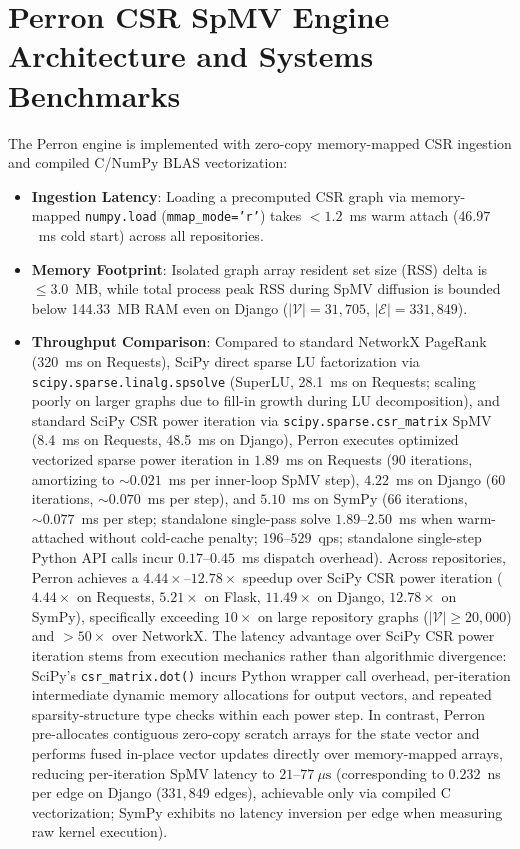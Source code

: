 \documentclass[10pt]{article}
\begin{document}
\section{Perron CSR SpMV Engine Architecture and Systems Benchmarks}
\label{app:csr_benchmarks}

The Perron engine is implemented with zero-copy memory-mapped CSR ingestion and compiled C/NumPy BLAS vectorization:
\begin{itemize}[noitemsep,topsep=2pt,parsep=0pt,partopsep=0pt]
    \item \textbf{Ingestion Latency}: Loading a precomputed CSR graph via memory-mapped \texttt{numpy.load} (\texttt{mmap\_mode='r'}) takes $<1.2$~ms warm attach ($46.97$~ms cold start) across all repositories.
    \item \textbf{Memory Footprint}: Isolated graph array resident set size (RSS) delta is $\le 3.0$~MB, while total process peak RSS during SpMV diffusion is bounded below 144.33~MB RAM even on Django ($|\mathcal{V}|=31{,}705$, $|\mathcal{E}|=331{,}849$).
    \item \textbf{Throughput Comparison}: Compared to standard NetworkX PageRank (320~ms on Requests), SciPy direct sparse LU factorization via \texttt{scipy.sparse.\allowbreak linalg.\allowbreak spsolve} (SuperLU, 28.1~ms on Requests; scaling poorly on larger graphs due to fill-in growth during LU decomposition), and standard SciPy CSR power iteration via \texttt{scipy.sparse.\allowbreak csr\_matrix} SpMV (8.4~ms on Requests, 48.5~ms on Django), Perron executes optimized vectorized sparse power iteration in $1.89$~ms on Requests (90 iterations, amortizing to $\sim 0.021$~ms per inner-loop SpMV step), $4.22$~ms on Django (60 iterations, $\sim 0.070$~ms per step), and $5.10$~ms on SymPy (66 iterations, $\sim 0.077$~ms per step; standalone single-pass solve $1.89\text{--}2.50$~ms when warm-attached without cold-cache penalty; $196\text{--}529$~qps; standalone single-step Python API calls incur $0.17\text{--}0.45$~ms dispatch overhead). Across repositories, Perron achieves a $4.44\times\text{--}12.78\times$ speedup over SciPy CSR power iteration ($4.44\times$ on Requests, $5.21\times$ on Flask, $11.49\times$ on Django, $12.78\times$ on SymPy), specifically exceeding $10\times$ on large repository graphs ($|\mathcal{V}| \ge 20{,}000$) and $>50\times$ over NetworkX. The latency advantage over SciPy CSR power iteration stems from execution mechanics rather than algorithmic divergence: SciPy's \texttt{csr\_matrix.dot()} incurs Python wrapper call overhead, per-iteration intermediate dynamic memory allocations for output vectors, and repeated sparsity-structure type checks within each power step. In contrast, Perron pre-allocates contiguous zero-copy scratch arrays for the state vector and performs fused in-place vector updates directly over memory-mapped arrays, reducing per-iteration SpMV latency to $21\text{--}77~\mu\text{s}$ (corresponding to $0.232$~ns per edge on Django ($331{,}849$ edges), achievable only via compiled C vectorization; SymPy exhibits no latency inversion per edge when measuring raw kernel execution).
\end{itemize}
\end{document}
